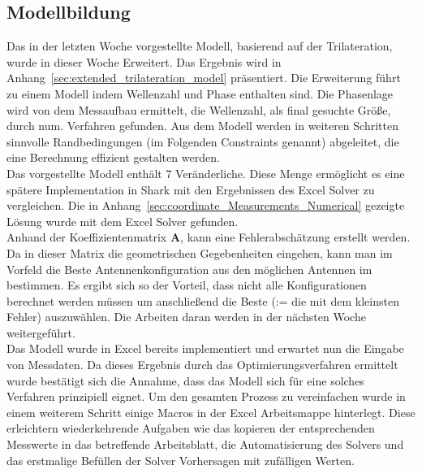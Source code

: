 \documentclass[a4paper,12pt,fleqn]{article}
\begin{document}
\subsection{Modellbildung}
Das in der letzten Woche vorgestellte Modell, basierend auf der Trilateration, wurde in dieser Woche Erweitert. Das Ergebnis wird in Anhang~\ref{sec:extended_trilateration_model} präsentiert. Die Erweiterung führt zu einem Modell indem Wellenzahl und Phase enthalten sind. Die Phasenlage wird von dem Messaufbau ermittelt, die Wellenzahl, als final gesuchte Größe, durch num. Verfahren gefunden. Aus dem Modell werden in weiteren Schritten sinnvolle Randbedingungen (im Folgenden Constraints genannt) abgeleitet, die eine Berechnung effizient gestalten werden.\\
%
Das vorgestellte Modell enthält 7 Veränderliche. Diese Menge ermöglicht es eine spätere Implementation in Shark mit den Ergebnissen des Excel Solver zu vergleichen. Die in Anhang~\ref{sec:coordinate_Measurements_Numerical} gezeigte Lösung wurde mit dem Excel Solver gefunden. \\
%
Anhand der Koeffizientenmatrix \textbf{A}, kann eine Fehlerabschätzung erstellt werden. Da in dieser Matrix die geometrischen Gegebenheiten eingehen, kann man im Vorfeld die Beste Antennenkonfiguration aus den möglichen Antennen im bestimmen. Es ergibt sich so der Vorteil, dass nicht alle Konfigurationen berechnet werden müssen um anschließend die Beste (:= die mit dem kleinsten Fehler) auszuwählen. Die Arbeiten daran werden in der nächsten Woche weitergeführt.\\
%
Das Modell wurde in Excel bereits implementiert und erwartet nun die Eingabe von Messdaten. Da dieses Ergebnis durch das Optimierungsverfahren ermittelt wurde bestätigt sich die Annahme, dass das Modell sich für eine solches Verfahren prinzipiell eignet. Um den gesamten Prozess zu vereinfachen wurde in einem weiterem Schritt einige Macros in der Excel Arbeitsmappe hinterlegt. Diese erleichtern wiederkehrende Aufgaben wie das kopieren der entsprechenden Messwerte in das betreffende Arbeitsblatt, die Automatisierung des Solvers und das erstmalige Befüllen der Solver Vorhersagen mit zufälligen Werten. \\

\end{document}
